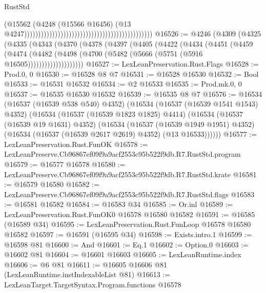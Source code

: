 \begin{lexlean}{RustStd}
\begin{coremodule}
                                                                                          (@15562
                                                                                            (@4248
                                                                                              (@15566
                                                                                                @16456)
                                                                                              (@13
                                                                                                @4247))))))))))))))))))))))))))))))))))))))))))))))
@16526 := @4246
    (@4309
      (@4325
        (@4335
          (@4343
            (@4370
              (@4378
                (@4397
                  (@4405
                    (@4422
                      (@4434
                        (@4451
                          (@4459
                            (@4474
                              (@4482
                                (@4498 (@4700 (@5482 (@5666 (@5751 (@5916 @16505))))))))))))))))))))
@16527 := LexLeanPreservation.Rust.Flags
@16528 := Prod.{0, 0}
@16530 := @16528 @8 @7
@16531 := @16528 @16530
@16532 := Bool
@16533 := @16531 @16532
@16534 := @2 @16533
@16535 := Prod.mk.{0, 0}
@16537 := @16535 @16530 @16532
@16539 := @16535 @8 @7
@16576 := @16534
    (@16537 (@16539 @538 @540) @4352)
    (@16534
      (@16537 (@16539 @1541 @1543) @4352)
      (@16534
        (@16537 (@16539 @1823 @1825) @4414)
        (@16534
          (@16537 (@16539 @19 @1631) @4352)
          (@16534
            (@16537 (@16539 @1949 @1951) @4352)
            (@16534 (@16537 (@16539 @2617 @2619) @4352) (@13 @16533))))))
@16577 := LexLeanPreservation.Rust.FunOK
@16578 := LexLeanPreserve.Cb96867ef09f9a9acf2553c95b522f9db.R7.RustStd.program
@16579 := @16577 @16578
@16580 := LexLeanPreserve.Cb96867ef09f9a9acf2553c95b522f9db.R7.RustStd.krate
@16581 := @16579 @16580
@16582 := LexLeanPreserve.Cb96867ef09f9a9acf2553c95b522f9db.R7.RustStd.flags
@16583 := @16581 @16582
@16584 := @16583 @34
@16585 := Or.inl
@16589 := LexLeanPreservation.Rust.FunOK0 @16578 @16580 @16582
@16591 := @16585 (@16589 @34)
@16595 := LexLeanPreservation.Rust.FunLoop @16578 @16580 @16582
@16597 := @16591 (@16595 @34)
@16598 := Exists.intro.{1}
@16599 := @16598 @81
@16600 := And
@16601 := Eq.{1}
@16602 := Option.{0}
@16603 := @16602 @81
@16604 := @16601 @16603
@16605 := LexLeanRuntime.index
@16606 := @6 @81
@16611 := @16605 @16606 @81 (LexLeanRuntime.instIndexableList @81)
@16613 := LexLeanTarget.TargetSyntax.Program.functions @16578

\end{coremodule}
\end{lexlean}
